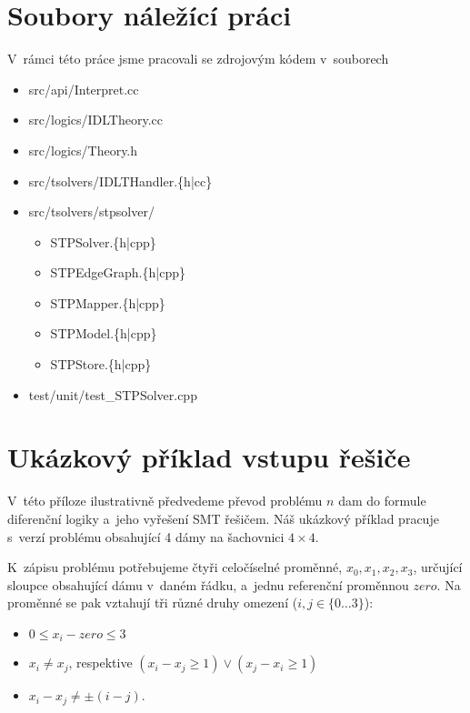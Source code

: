 \documentclass[12pt,a4paper]{report}
\begin{document}
\section{Soubory náležící práci}
V~rámci této práce jsme pracovali se zdrojovým kódem v~souborech
\begin{itemize}
	\tt
	\item src/api/Interpret.cc\footnotemark
	\item src/logics/IDLTheory.cc\footnotemark[\value{footnote}]
	\item src/logics/Theory.h\footnotemark[\value{footnote}]
	\item src/tsolvers/IDLTHandler.\{h|cc\}\footnotemark[\value{footnote}]
	\item src/tsolvers/stpsolver/
	\begin{itemize}
		\item[] STPSolver.\{h|cpp\}\footnotemark[\value{footnote}]
		\item[] STPEdgeGraph.\{h|cpp\}
		\item[] STPMapper.\{h|cpp\}
		\item[] STPModel.\{h|cpp\}
		\item[] STPStore.\{h|cpp\}
	\end{itemize}
	\item test/unit/test\_STPSolver.cpp\footnotemark[\value{footnote}]
\end{itemize}

\section{Ukázkový příklad vstupu řešiče}\label{priklad}

V~této příloze ilustrativně předvedeme převod problému $n$ dam do formule diferenční logiky a~jeho vyřešení SMT řešičem. Náš ukázkový příklad pracuje s~verzí problému obsahující 4 dámy na šachovnici $4\times 4$.

K~zápisu problému potřebujeme čtyři celočíselné proměnné, $x_0, x_1, x_2, x_3$, určující sloupce obsahující dámu v~daném řádku, a~jednu referenční proměnnou $zero$.
\newpage %
Na proměnné se pak vztahují tři různé druhy omezení ($i, j \in \{0\dots3\}$):
\begin{itemize}
	\item $0 \leq x_i - zero \leq 3$
	\item $x_i \neq x_j$, respektive $(x_i - x_j \geq 1) \lor (x_j - x_i \geq 1)$
	\item $x_i - x_j \neq \pm(i-j)$.
\end{itemize}
\end{document}
